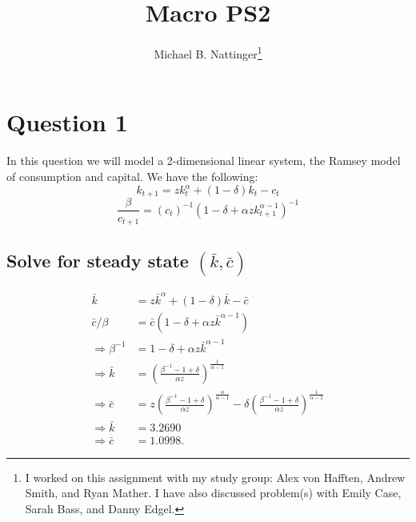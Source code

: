 \documentclass[11pt]{article} %
\title{Macro PS2}
\author{Michael B. Nattinger\footnote{I worked on this assignment with my study group: Alex von Hafften, Andrew Smith, and Ryan Mather. I have also discussed problem(s) with Emily Case, Sarah Bass, and Danny Edgel.}}
\begin{document}
\maketitle

\section{Question 1}
In this question we will model a 2-dimensional linear system, the Ramsey model of consumption and capital. We have the following:
\begin{equation}
k_{t+1} = zk_{t}^{\alpha} + (1-\delta) k_t - c_t \label{eqn:kap}
\end{equation}
\begin{equation}
\frac{\beta}{c_{t+1}} = (c_t)^{-1} (1 - \delta + \alpha z k_{t+1}^{\alpha - 1})^{-1}  \label{eqn:con}
\end{equation}
\subsection{Solve for steady state $(\bar{k},\bar{c})$}
\begin{align*}
\bar{k} &= z \bar{k}^{\alpha} + (1-\delta) \bar{k} - \bar{c}\\
\bar{c}/\beta &= \bar{c} (1 - \delta + \alpha z \bar{k}^{\alpha - 1}) \\
\Rightarrow \beta^{-1} &= 1 - \delta + \alpha z \bar{k}^{\alpha -1} \\
\Rightarrow \bar{k} &= \left(\frac{\beta^{-1} -1 + \delta}{\alpha z}\right)^{\frac{1}{\alpha-1}} \\
\Rightarrow \bar{c} &= z \left(\frac{\beta^{-1} -1 + \delta}{\alpha z}\right)^{\frac{\alpha}{\alpha-1}} - \delta  \left(\frac{\beta^{-1} -1 + \delta}{\alpha z}\right)^{\frac{1}{\alpha-1}} \\
\Rightarrow \bar{k} &= 3.2690 \\
\Rightarrow \bar{c} &= 1.0998.
\end{align*}
\end{document}
